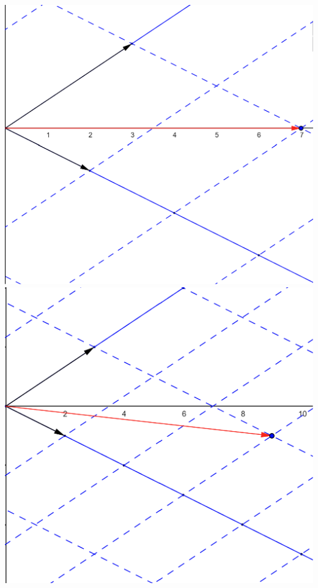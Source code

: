 \documentclass[english,9pt,xcolor=dvipsnames,notheorems]{beamer}
\begin{document}
\begin{frame}
 \vspace{-4 cm}
\includegraphics[scale=0.2]{Learning_Standards_Revised_Summer_2023/Lectures/coordinate1.png}\quad \quad \includegraphics[scale=0.2]{Learning_Standards_Revised_Summer_2023/Lectures/coordinate3.png}


\end{frame}
\end{document}
